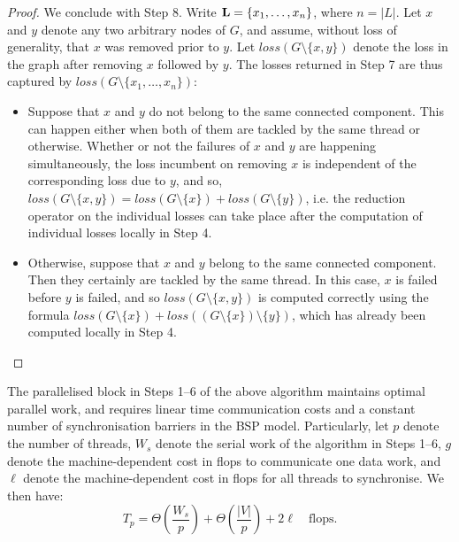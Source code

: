 \begin{proof}
We conclude with Step 8. Write ${\bf L} = \{x_1,\ldots,x_n\}$, where $n = \left \vert L \right \vert$. Let $x$ and $y$ denote any two arbitrary nodes of $G$, and assume, without loss of generality, that $x$ was removed prior to $y$. Let $loss(G\setminus \{x,y\})$ denote the loss in the graph after removing $x$ followed by $y$. The losses returned in Step 7 are thus captured by $loss(G\setminus \{x_1,\ldots,x_n\})$:
\begin{itemize}
\item{Suppose that $x$ and $y$ do not belong to the same connected component. This can happen either when both of them are tackled by the same thread or otherwise. Whether or not the failures of $x$ and $y$ are happening simultaneously, the loss incumbent on removing $x$ is independent of the corresponding loss due to $y$, and so, $loss(G\setminus \{x,y\}) = loss (G \setminus \{x\}) + loss (G \setminus \{y\})$, i.e. the reduction operator on the individual losses can take place after the computation of individual losses locally in Step 4.}
\item{Otherwise, suppose that $x$ and $y$ belong to the same connected component. Then they certainly are tackled by the same thread. In this case, $x$ is failed before $y$ is failed, and so $loss(G\setminus \{x,y\})$ is computed correctly using the formula $loss(G \setminus \{x\}) + loss \left (\left(G \setminus \{x\}\right)\setminus \{y\}\right)$, which has already been computed locally in Step 4.} 
\end{itemize}
\end{proof}
\begin{proposition}
The parallelised block in Steps 1--6 of the above algorithm maintains optimal parallel work, and requires linear time communication costs and a constant number of synchronisation barriers in the BSP model. Particularly, let $p$ denote the number of threads, $W_s$ denote the serial work of the algorithm in Steps 1--6, $g$ denote the machine-dependent cost in flops to communicate one data work, and $\ell$ denote the machine-dependent cost in flops for all threads to synchronise. We then have:
\[
T_p = \Theta\left(\frac{W_s}{p}\right) + \Theta \left(\frac{\left \vert V \right \vert}{p}\right) + 2 \ell \quad \mbox{flops.} 
\]
\end{proposition}

